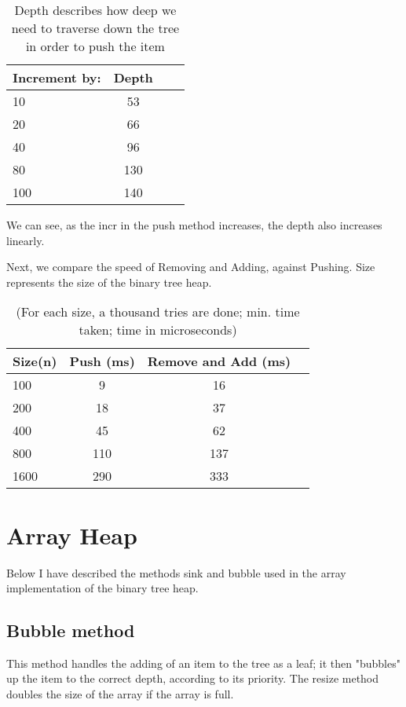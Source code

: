 \documentclass[a4paper,11pt]{article}
\begin{document}
\begin{table}[h]
\begin{center}
\begin{tabular}{l|c|c|c}
\textbf{Increment by:} & \textbf{Depth}\\
\hline
  10      &  53\\
  20      &  66\\
  40      &  96\\
  80      &  130\\
  100      &  140\\
\end{tabular}
\caption{Depth describes how deep we need to traverse down the tree in order to push the item}
\label{tab:table1}
\end{center}
\end{table}

We can see, as the incr in the push method increases, the depth also increases linearly.

Next, we compare the speed of Removing and Adding, against Pushing. Size represents the size of the binary tree heap.

\begin{table}[h]
\begin{center}
\begin{tabular}{l|c|c|c}
\textbf{Size(n)} & \textbf{Push (ms)} & \textbf{Remove and Add (ms)}\\
\hline
  100     &  9     &  16\\
  200      &  18     &  37\\
  400      &  45     &  62\\
  800      &  110     &  137\\
  1600      &  290     &  333\\
\end{tabular}
\caption{(For each size, a thousand tries are done; min. time taken; time in microseconds)}
\label{tab:table1}
\end{center}
\end{table}

\section*{Array Heap}
Below I have described the methods sink and bubble used in the array implementation of the binary tree heap.

\subsection*{Bubble method}
 This method handles the adding of an item to the tree as a leaf; it then "bubbles" up the item to the correct depth, according to its priority. The resize method doubles the size of the array if the array is full.
 
\end{document}
